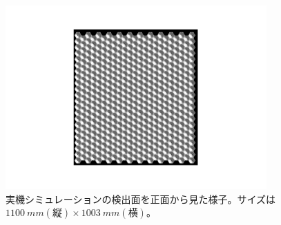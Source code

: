\begin{figure}
  \centering
  \includegraphics[width=10cm]{images/chapter4/ActualSimulationDetectorPlane.pdf}
  \caption{
    実機シミュレーションの検出面を正面から見た様子。サイズは$\SI{1100}{mm}(縦)\times\SI{1003}{mm}(横)$。
  }
  \label{fig:ActualSimulationDetectorPlane}
\end{figure}

